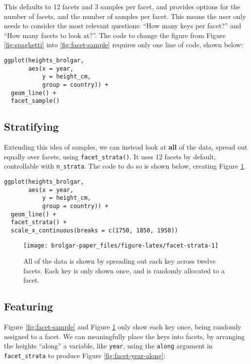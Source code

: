 This defaults to 12 facets and 3 samples per facet, and provides options for the number of facets, and the number of samples per facet. This means the user only needs to consider the most relevant questions: ``How many keys per facet?'' and ``How many facets to look at?''. The code to change the figure from Figure \ref{fig:spaghetti} into \ref{fig:facet-sample} requires only one line of code, shown below:

\begin{verbatim}
ggplot(heights_brolgar,
       aes(x = year,
           y = height_cm,
           group = country)) + 
  geom_line() + 
  facet_sample()
\end{verbatim}

\hypertarget{stratifying}{%
\subsection{Stratifying}\label{stratifying}}

Extending this idea of samples, we can instead look at \textbf{all} of the data, spread out equally over facets, using \texttt{facet\_strata()}. It uses 12 facets by default, controllable with \texttt{n\_strata}. The code to do so is shown below, creating Figure \ref{fig:facet-strata}.

\begin{verbatim}
ggplot(heights_brolgar,
       aes(x = year,
           y = height_cm,
           group = country)) + 
  geom_line() + 
  facet_strata() +
  scale_x_continuous(breaks = c(1750, 1850, 1950))
\end{verbatim}

\begin{figure}

{\centering \texttt{[image: brolgar-paper\_files/figure-latex/facet-strata-1]} 

}

\caption{All of the data is shown by spreading out each key across twelve facets. Each key is only shown once, and is randomly allocated to a facet.}\label{fig:facet-strata}
\end{figure}

\hypertarget{featuring}{%
\subsection{Featuring}\label{featuring}}

Figure \ref{fig:facet-sample} and Figure \ref{fig:facet-strata} only show each key once, being randomly assigned to a facet. We can meaningfully place the keys into facets, by arranging the heights ``along'' a variable, like \texttt{year}, using the \texttt{along} argument in \texttt{facet\_strata} to produce Figure \ref{fig:facet-year-along}:

